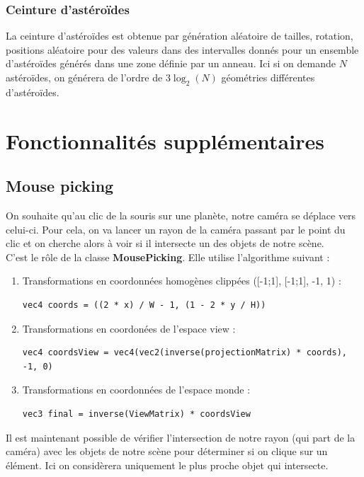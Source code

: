 \documentclass[11pt,a4paper]{article}
\begin{document}
\subsubsection{Ceinture d'astéroïdes}

La ceinture d'astéroïdes est obtenue par génération aléatoire de tailles, rotation, positions aléatoire pour des valeurs dans des intervalles donnés pour un ensemble d'astéroïdes générés dans une zone définie par un anneau. Ici si on demande $N$ astéroïdes, on générera de l'ordre de $3 \log_2\left(N\right)$ géométries différentes d'astéroïdes.

\section{Fonctionnalités supplémentaires}

\subsection{Mouse picking}
On souhaite qu'au clic de la souris sur une planète, notre caméra se déplace vers celui-ci. Pour cela, on va lancer
un rayon de la caméra passant par le point du clic et on cherche alors à voir si il intersecte un des objets de notre scène.\\
C'est le rôle de la classe \textbf{MousePicking}. Elle utilise l'algorithme suivant :
\begin{enumerate}
\item Transformations en coordonnées homogènes clippées ([-1;1], [-1;1], -1, 1) :
\begin{lstlisting}
vec4 coords = ((2 * x) / W - 1, (1 - 2 * y / H))
\end{lstlisting}

\item Transformations en coordonées de l'espace view :
\begin{lstlisting}
vec4 coordsView = vec4(vec2(inverse(projectionMatrix) * coords), -1, 0)
\end{lstlisting}

\item Transformations en coordonnées de l'espace monde :
\begin{lstlisting}
vec3 final = inverse(ViewMatrix) * coordsView
\end{lstlisting}
\end{enumerate}
Il est maintenant possible de vérifier l'intersection de notre rayon (qui part de la caméra) avec les objets de notre scène pour déterminer si on clique sur un élément. Ici on considèrera uniquement le plus proche objet qui intersecte.
\end{document}
